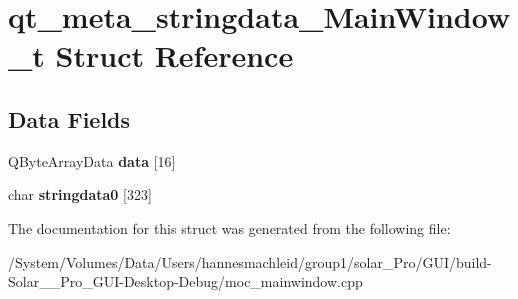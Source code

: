 \hypertarget{structqt__meta__stringdata___main_window__t}{}\section{qt\+\_\+meta\+\_\+stringdata\+\_\+\+Main\+Window\+\_\+t Struct Reference}
\label{structqt__meta__stringdata___main_window__t}
\subsection*{Data Fields}
\begin{DoxyCompactItemize}
\item 
\mbox{\label{structqt__meta__stringdata___main_window__t_ac039fccba55ed1c4a316f23fd05bc137}} 
Q\+Byte\+Array\+Data {\bfseries data} \mbox{[}16\mbox{]}
\item 
\mbox{\label{structqt__meta__stringdata___main_window__t_a0946fc29828f11a861a646fc7cb3ed38}} 
char {\bfseries stringdata0} \mbox{[}323\mbox{]}
\end{DoxyCompactItemize}


The documentation for this struct was generated from the following file\+:\begin{DoxyCompactItemize}
\item 
/\+System/\+Volumes/\+Data/\+Users/hannesmachleid/group1/solar\+\_\+\+Pro/\+G\+U\+I/build-\/\+Solar\+\_\+\+\_\+\+Pro\+\_\+\+G\+U\+I-\/\+Desktop-\/\+Debug/moc\+\_\+mainwindow.\+cpp\end{DoxyCompactItemize}
